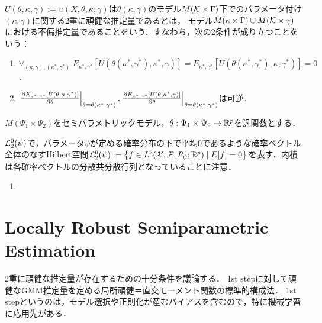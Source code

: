 \documentclass[uplatex,dvipdfmx]{jsreport}
\begin{document}
\begin{definition}
    $U(\theta,\kappa,\gamma):=u(X,\theta,\kappa,\gamma)$は$\theta(\kappa,\gamma)$のモデル$M(\mathcal{K}\times\Gamma)$下でのパラメータ付け$(\kappa,\gamma)$に関する2重に頑健な推定量であるとは，
    モデル$M(\kappa\times\Gamma)\cup M(\mathcal{K}\times\gamma)$における不偏推定量であることをいう．すなわち，次の2条件が成り立つことをいう：
    \begin{enumerate}
        \item $\forall_{(\kappa,\gamma),(\kappa^*,\gamma^*)}\;E_{\kappa^*,\gamma^*}[U(\theta(\kappa^*,\gamma^*),\kappa^*,\gamma)]=E_{\kappa^*,\gamma^*}[U(\theta(\kappa^*,\gamma^*),\kappa,\gamma^*)]=0$．
        \item $\left.\frac{\partial E_{\kappa^*,\gamma^*}[U(\theta,\kappa,\gamma^*)]}{\partial \theta}\right|_{\theta=\theta(\kappa^*,\gamma^*)},\left.\frac{\partial E_{\kappa^*,\gamma^*}[U(\theta,\kappa^*,\gamma)]}{\partial \theta}\right|_{\theta=\theta(\kappa^*,\gamma^*)}$は可逆．
    \end{enumerate}
\end{definition}

\begin{notation}
    $M(\Psi_1\times\Psi_2)$をセミパラメトリックモデル，$\theta:\Psi_1\times\Psi_2\to\mathbb{R}^p$を汎関数とする．
\end{notation}

\begin{definition}
    $\mathcal{L}^0_2(\psi)$で，パラメータ$\psi$が定める確率分布の下で平均$0$であるような確率ベクトル全体のなすHilbert空間$\mathcal{L}^0_2(\psi):=\left\{f\in L^2(\mathcal{X},\mathcal{F},P_\psi;\mathbb{R}^p)\mid E[f]=0\right\}$を表す．内積は各確率ベクトルの分散共分散行列となっていることに注意．
    \begin{enumerate}
        \item 
    \end{enumerate}
\end{definition}

\section{Locally Robust Semiparametric Estimation}

\begin{tcolorbox}[colframe=ForestGreen, colback=ForestGreen!10!white,breakable,colbacktitle=ForestGreen!40!white,coltitle=black,fonttitle=\bfseries\sffamily,
title=]
    2重に頑健な推定量が存在するための十分条件を議論する．
    1st stepに対して頑健なGMM推定量を定める局所頑健＝直交モーメント関数の標準的構成法．
    1st stepというのは，モデル選択や正則化が産むバイアスを含むので，特に機械学習に応用先がある．
\end{tcolorbox}
\end{document}
